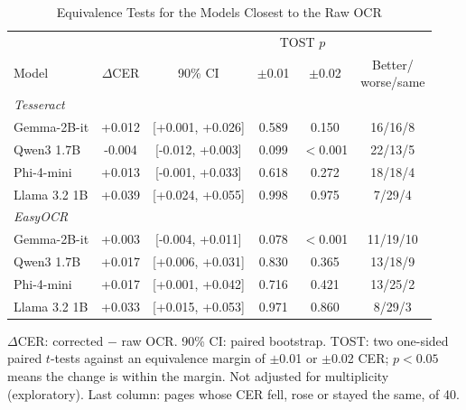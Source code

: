 \begin{table}[t]
\centering
\caption{Equivalence Tests for the Models Closest to the Raw OCR}
\label{tab:equivalence}
\setlength{\tabcolsep}{3pt}
\footnotesize
\begin{tabular}{lccccc}
\toprule
 & & & \multicolumn{2}{c}{TOST $p$} & \\
\cmidrule(lr){4-5}
Model & $\Delta$CER & 90\% CI & $\pm$0.01 & $\pm$0.02 & \shortstack{Better/\\worse/same} \\
\midrule
\multicolumn{6}{l}{\textit{Tesseract}} \\
Gemma-2B-it & +0.012 & [+0.001, +0.026] & 0.589 & 0.150 & 16/16/8 \\
Qwen3 1.7B & -0.004 & [-0.012, +0.003] & 0.099 & $<$0.001 & 22/13/5 \\
Phi-4-mini & +0.013 & [-0.001, +0.033] & 0.618 & 0.272 & 18/18/4 \\
Llama 3.2 1B & +0.039 & [+0.024, +0.055] & 0.998 & 0.975 & 7/29/4 \\
\midrule
\multicolumn{6}{l}{\textit{EasyOCR}} \\
Gemma-2B-it & +0.003 & [-0.004, +0.011] & 0.078 & $<$0.001 & 11/19/10 \\
Qwen3 1.7B & +0.017 & [+0.006, +0.031] & 0.830 & 0.365 & 13/18/9 \\
Phi-4-mini & +0.017 & [+0.001, +0.042] & 0.716 & 0.421 & 13/25/2 \\
Llama 3.2 1B & +0.033 & [+0.015, +0.053] & 0.971 & 0.860 & 8/29/3 \\
\bottomrule
\end{tabular}
\par\smallskip
\begin{minipage}{\linewidth}\footnotesize $\Delta$CER: corrected $-$ raw OCR. 90\% CI: paired bootstrap. TOST: two one-sided paired $t$-tests against an equivalence margin of $\pm$0.01 or $\pm$0.02 CER; $p<0.05$ means the change is within the margin. Not adjusted for multiplicity (exploratory). Last column: pages whose CER fell, rose or stayed the same, of 40.\end{minipage}
\end{table}
